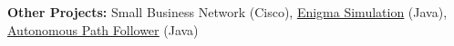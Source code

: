     \resumeProjectHeading
    {\textbf{Other Projects:} Small Business Network (Cisco), \href{https://github.com/sirpoetvic/Enigma-Encoder}{\underline{Enigma Simulation}} (Java), \href{https://github.com/HazenRobotics/center-stage}{\underline{Autonomous Path Follower}} (Java)}

\resumeSubHeadingListEnd
